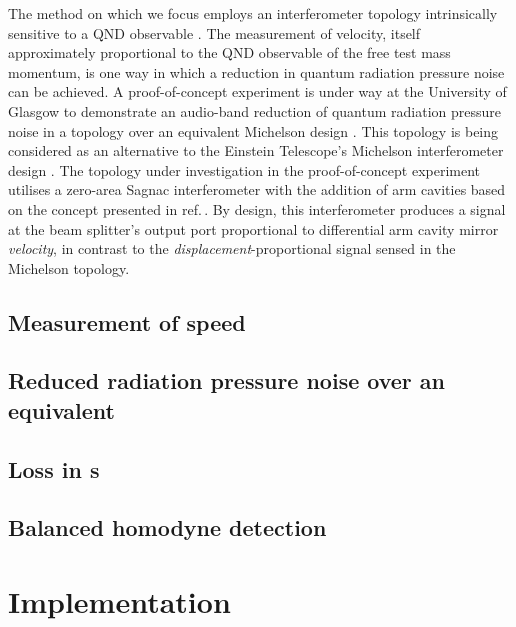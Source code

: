 The method on which we focus employs an interferometer topology intrinsically sensitive to a QND observable \cite{Danilishin2012}. The measurement of velocity, itself approximately proportional to the QND observable of the free test mass momentum, is one way in which a reduction in quantum radiation pressure noise can be achieved. A proof-of-concept experiment is under way at the University of Glasgow to demonstrate an audio-band reduction of quantum radiation pressure noise in a \SSM{} topology over an equivalent Michelson design \cite{Graef2014}. This topology is being considered as an alternative to the Einstein Telescope's Michelson interferometer design \cite{MuellerEbhardt2009a, Voronchev2015}. The topology under investigation in the proof-of-concept experiment utilises a zero-area Sagnac interferometer with the addition of arm cavities based on the concept presented in ref.\,\cite{Chen2003}. By design, this interferometer produces a signal at the beam splitter's output port proportional to differential arm cavity mirror \emph{velocity}, in contrast to the \emph{displacement}-proportional signal sensed in the Michelson topology.

\subsection{Measurement of speed}

\subsection{Reduced radiation pressure noise over an equivalent \MI{}}

\subsection{Loss in \SSM{}s}

\subsection{\label{sec:bhd-intro}Balanced homodyne detection}

\section{Implementation}

